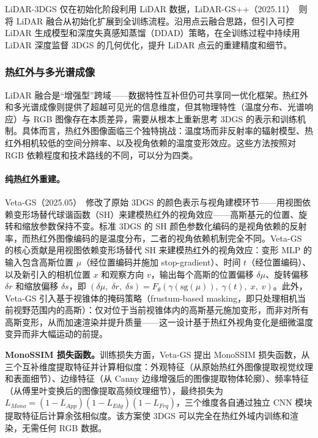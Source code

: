 LiDAR-3DGS 仅在初始化阶段利用 LiDAR 数据，LiDAR-GS++（2025.11）~\cite{2511_12304}则将 LiDAR 融合从初始化扩展到全训练流程。沿用点云融合思路，但引入可控 LiDAR 生成模型和深度失真感知蒸馏（DDAD）策略，在全训练过程中持续用 LiDAR 深度监督 3DGS 的几何优化，提升 LiDAR 点云的重建精度和细节。

\subsubsection{热红外与多光谱成像}

LiDAR 融合是“增强型”跨域——数据特性互补但仍可共享同一优化框架。热红外和多光谱成像则提供了超越可见光的信息维度，但其物理特性（温度分布、光谱响应）与 RGB 图像存在本质差异，需要从根本上重新思考 3DGS 的表示和训练机制。具体而言，热红外图像面临三个独特挑战：温度场而非反射率的辐射模型、热红外相机较低的空间分辨率、以及视角依赖的温度变形效应。这些方法按照对 RGB 依赖程度和技术路线的不同，可以分为四类。

\paragraph{纯热红外重建。} Veta-GS（2025.05）~\cite{2505_19138}修改了原始 3DGS 的颜色表示与视角建模环节——用视图依赖变形场替代球谐函数（SH）来建模热红外的视角效应——高斯基元的位置、旋转和缩放参数保持不变。标准 3DGS 的 SH 颜色参数化编码的是视角依赖的反射率，而热红外图像编码的是温度分布，二者的视角依赖机制完全不同。Veta-GS 的核心贡献是用视图依赖变形场替代 SH 来建模热红外的视角效应：变形 MLP 的输入包含高斯位置 $\mu$（经位置编码并施加 stop-gradient）、时间 $t$（经位置编码）、以及新引入的相机位置 $x$ 和观察方向 $v$，输出每个高斯的位置偏移 $\delta\mu$、旋转偏移 $\delta r$ 和缩放偏移 $\delta s$，即 $(\delta\mu,\;\delta r,\;\delta s) = F_\theta(\gamma(\text{sg}(\mu)),\;\gamma(t),\;x,\;v)$。此外，Veta-GS 引入基于视锥体的掩码策略（frustum-based masking，即只处理相机当前视野范围内的高斯）：仅对位于当前视锥体内的高斯基元施加变形，而非对所有高斯变形，从而加速渲染并提升质量——这一设计基于热红外视角变化是细微温度变异而非大幅运动的前提。

\textbf{MonoSSIM 损失函数。}训练损失方面，Veta-GS 提出 MonoSSIM 损失函数，从三个互补维度提取特征并计算相似度：外观特征（从原始热红外图像提取视觉纹理和表面细节）、边缘特征（从 Canny 边缘增强后的图像提取物体轮廓）、频率特征（从傅里叶变换后的图像提取高频纹理细节），最终损失为 $L_{Mono} = (1-L_{App})(1-L_{Edg})(1-L_{Frq})$，三个维度各自通过独立 CNN 模块提取特征后计算余弦相似度。该方案使 3DGS 可以完全在热红外域内训练和渲染，无需任何 RGB 数据。

